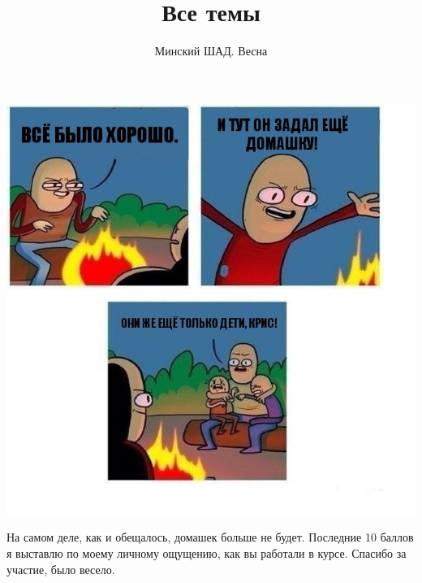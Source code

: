 \documentclass[addpoints]{exam}
\title{Все темы}
\author{Минский ШАД. Весна}
\begin{document}
\maketitle

\begin{center}
\includegraphics[scale=0.7]{homework.jpg}
\end{center}

На самом деле, как и обещалось, домашек больше не будет. Последние 10 баллов я выставлю по моему личному ощущению, как вы работали в курсе. Спасибо за участие, было весело.
\end{document}
